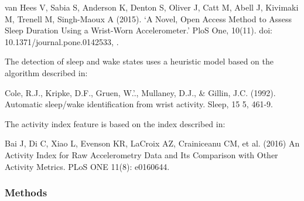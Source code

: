 \documentclass[letterpaper,10pt,english]{sphinxmanual}
\begin{document}
\begin{fulllineitems}
van Hees V, Sabia S, Anderson K, Denton S, Oliver J, Catt M, Abell J, Kivimaki M, Trenell M, Singh-Maoux A (2015).
‘A Novel, Open Access Method to Assess Sleep Duration Using a Wrist-Worn Accelerometer.’ PloS One, 10(11).
doi: 10.1371/journal.pone.0142533, .

The detection of sleep and wake states uses a heuristic model based on the algorithm described in:

Cole, R.J., Kripke, D.F., Gruen, W.’., Mullaney, D.J., \& Gillin, J.C. (1992). Automatic sleep/wake identification
from wrist activity. Sleep, 15 5, 461-9.

The activity index feature is based on the index described in:

Bai J, Di C, Xiao L, Evenson KR, LaCroix AZ, Crainiceanu CM, et al. (2016) An Activity Index for Raw Accelerometry
Data and Its Comparison with Other Activity Metrics. PLoS ONE 11(8): e0160644.
\subsubsection*{Methods}


\begin{savenotes}\sphinxatlongtablestart\begin{longtable}[c]{}
\hline

\endfirsthead

%
{}\\
\hline

\endhead

\hline
{}\\
\endfoot

\endlastfoot


\end{longtable}
\end{savenotes}
\end{fulllineitems}
\end{document}
